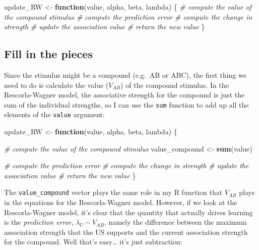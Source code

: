 \documentclass[]{book}
\newenvironment{Shaded}{\begin{snugshade}}{\end{snugshade}}
\newcommand{\CommentTok}[1]{\textcolor[rgb]{0.56,0.35,0.01}{\textit{#1}}}
\newcommand{\ControlFlowTok}[1]{\textcolor[rgb]{0.13,0.29,0.53}{\textbf{#1}}}
\newcommand{\KeywordTok}[1]{\textcolor[rgb]{0.13,0.29,0.53}{\textbf{#1}}}
\newcommand{\NormalTok}[1]{#1}
\newcommand{\StringTok}[1]{\textcolor[rgb]{0.31,0.60,0.02}{#1}}
\begin{document}
\begin{Shaded}
\begin{Highlighting}[]
\NormalTok{update_RW <-}\StringTok{ }\ControlFlowTok{function}\NormalTok{(value, alpha, beta, lambda) \{}
  \CommentTok{# compute the value of the compound stimulus}
  \CommentTok{# compute the prediction error}
  \CommentTok{# compute the change in strength}
  \CommentTok{# update the association value}
  \CommentTok{# return the new value}
\NormalTok{\}}
\end{Highlighting}
\end{Shaded}

\hypertarget{fill-in-the-pieces}{%
\subsection{Fill in the pieces}\label{fill-in-the-pieces}}

Since the stimulus might be a compound (e.g.~AB or ABC), the first thing we need to do is calculate the value (\(V_{AB}\)) of the compound stimulus. In the Rescorla-Wagner model, the associative strength for the compound is just the sum of the individual strengths, so I can use the \texttt{sum} function to add up all the elements of the \texttt{value} argument:

\begin{Shaded}
\begin{Highlighting}[]
\NormalTok{update_RW <-}\StringTok{ }\ControlFlowTok{function}\NormalTok{(value, alpha, beta, lambda) \{}
  
  \CommentTok{# compute the value of the compound stimulus}
\NormalTok{  value_compound <-}\StringTok{ }\KeywordTok{sum}\NormalTok{(value) }
  
  \CommentTok{# compute the prediction error}
  \CommentTok{# compute the change in strength}
  \CommentTok{# update the association value}
  \CommentTok{# return the new value}
\NormalTok{\}}
\end{Highlighting}
\end{Shaded}

The \texttt{value\_compound} vector plays the same role in my R function that \(V_{AB}\) plays in the equations for the Rescorla-Wagner model. However, if we look at the Rescorla-Wagner model, it's clear that the quantity that actually drives learning is the \emph{prediction error}, \(\lambda_U - V_{AB}\), namely the difference between the maximum association strength that the US supports and the current association strength for the compound. Well that's easy\ldots{} it's just subtraction:
\end{document}

